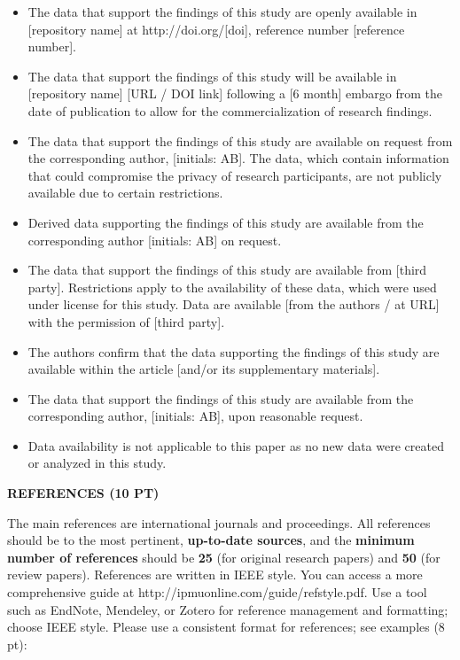 \documentclass[
]{article}
\begin{document}
\begin{itemize}
\item
  The data that support the findings of this study are openly available in {[}repository name{]} at http://doi.org/{[}doi{]}, reference number {[}reference number{]}.
\item
  The data that support the findings of this study will be available in {[}repository name{]} {[}URL / DOI link{]} following a {[}6 month{]} embargo from the date of publication to allow for the commercialization of research findings.
\item
  The data that support the findings of this study are available on request from the corresponding author, {[}initials: AB{]}. The data, which contain information that could compromise the privacy of research participants, are not publicly available due to certain restrictions.
\item
  Derived data supporting the findings of this study are available from the corresponding author {[}initials: AB{]} on request.
\item
  The data that support the findings of this study are available from {[}third party{]}. Restrictions apply to the availability of these data, which were used under license for this study. Data are available {[}from the authors / at URL{]} with the permission of {[}third party{]}.
\item
  The authors confirm that the data supporting the findings of this study are available within the article {[}and/or its supplementary materials{]}.
\item
  The data that support the findings of this study are available from the corresponding author, {[}initials: AB{]}, upon reasonable request.
\item
  Data availability is not applicable to this paper as no new data were created or analyzed in this study.
\end{itemize}

\textbf{REFERENCES (10 PT)}

The main references are international journals and proceedings. All references should be to the most pertinent, \textbf{up-to-date sources}, and the \textbf{minimum number of references} should be \textbf{25} (for original research papers) and \textbf{50} (for review papers). References are written in IEEE style. You can access a more comprehensive guide at http://ipmuonline.com/guide/refstyle.pdf. Use a tool such as EndNote, Mendeley, or Zotero for reference management and formatting; choose IEEE style. Please use a consistent format for references; see examples (8 pt):
\end{document}
